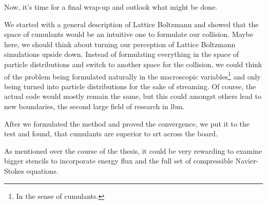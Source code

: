 
Now, it's time for a final wrap-up and outlook what might be done.

We started with a general description of Lattice Boltzmann and showed that the space of cumulants would be an intuitive one to formulate our collision.
Maybe here, we should think about turning our perception of Lattice Boltzmann simulations upside down.
Instead of formulating everything in the space of particle distributions and switch to another space for the collision, we could think of the problem being formulated naturally in the macroscopic variables\footnote{In the sense of cumulants.} and only being turned into particle distributions for the sake of streaming.
Of course, the actual code would mostly remain the same, but this could amongst others lead to new boundaries, the second large field of research in \gls{lbm}.

After we formulated the method and proved the convergence, we put it to the test and found, that cumulants are superior to \gls{srt} across the board.

As mentioned over the course of the thesis, it could be very rewarding to examine bigger stencils to incorporate energy flux and the full set of compressible Navier-Stokes equations.
